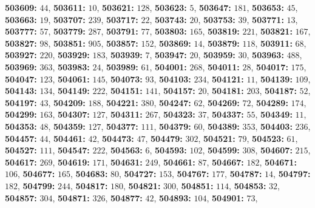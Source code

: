 \textsf{\bfseries 503609:} $44$, \textsf{\bfseries 503611:} $10$, \textsf{\bfseries 503621:} $128$, \textsf{\bfseries 503623:} $5$, \textsf{\bfseries 503647:} $181$, \textsf{\bfseries 503653:} $45$, \textsf{\bfseries 503663:} $19$, \textsf{\bfseries 503707:} $239$, \textsf{\bfseries 503717:} $22$, \textsf{\bfseries 503743:} $20$, \textsf{\bfseries 503753:} $39$, \textsf{\bfseries 503771:} $13$, \textsf{\bfseries 503777:} $57$, \textsf{\bfseries 503779:} $287$, \textsf{\bfseries 503791:} $77$, \textsf{\bfseries 503803:} $165$, \textsf{\bfseries 503819:} $221$, \textsf{\bfseries 503821:} $167$, \textsf{\bfseries 503827:} $98$, \textsf{\bfseries 503851:} $905$, \textsf{\bfseries 503857:} $152$, \textsf{\bfseries 503869:} $14$, \textsf{\bfseries 503879:} $118$, \textsf{\bfseries 503911:} $68$, \textsf{\bfseries 503927:} $220$, \textsf{\bfseries 503929:} $183$, \textsf{\bfseries 503939:} $7$, \textsf{\bfseries 503947:} $20$, \textsf{\bfseries 503959:} $30$, \textsf{\bfseries 503963:} $488$, \textsf{\bfseries 503969:} $363$, \textsf{\bfseries 503983:} $24$, \textsf{\bfseries 503989:} $61$, \textsf{\bfseries 504001:} $268$, \textsf{\bfseries 504011:} $28$, \textsf{\bfseries 504017:} $175$, \textsf{\bfseries 504047:} $123$, \textsf{\bfseries 504061:} $145$, \textsf{\bfseries 504073:} $93$, \textsf{\bfseries 504103:} $234$, \textsf{\bfseries 504121:} $11$, \textsf{\bfseries 504139:} $109$, \textsf{\bfseries 504143:} $134$, \textsf{\bfseries 504149:} $222$, \textsf{\bfseries 504151:} $141$, \textsf{\bfseries 504157:} $20$, \textsf{\bfseries 504181:} $203$, \textsf{\bfseries 504187:} $52$, \textsf{\bfseries 504197:} $43$, \textsf{\bfseries 504209:} $188$, \textsf{\bfseries 504221:} $380$, \textsf{\bfseries 504247:} $62$, \textsf{\bfseries 504269:} $72$, \textsf{\bfseries 504289:} $174$, \textsf{\bfseries 504299:} $163$, \textsf{\bfseries 504307:} $127$, \textsf{\bfseries 504311:} $267$, \textsf{\bfseries 504323:} $37$, \textsf{\bfseries 504337:} $55$, \textsf{\bfseries 504349:} $11$, \textsf{\bfseries 504353:} $48$, \textsf{\bfseries 504359:} $127$, \textsf{\bfseries 504377:} $111$, \textsf{\bfseries 504379:} $60$, \textsf{\bfseries 504389:} $353$, \textsf{\bfseries 504403:} $236$, \textsf{\bfseries 504457:} $44$, \textsf{\bfseries 504461:} $42$, \textsf{\bfseries 504473:} $47$, \textsf{\bfseries 504479:} $302$, \textsf{\bfseries 504521:} $79$, \textsf{\bfseries 504523:} $61$, \textsf{\bfseries 504527:} $111$, \textsf{\bfseries 504547:} $222$, \textsf{\bfseries 504563:} $6$, \textsf{\bfseries 504593:} $102$, \textsf{\bfseries 504599:} $308$, \textsf{\bfseries 504607:} $215$, \textsf{\bfseries 504617:} $269$, \textsf{\bfseries 504619:} $171$, \textsf{\bfseries 504631:} $249$, \textsf{\bfseries 504661:} $87$, \textsf{\bfseries 504667:} $182$, \textsf{\bfseries 504671:} $106$, \textsf{\bfseries 504677:} $165$, \textsf{\bfseries 504683:} $80$, \textsf{\bfseries 504727:} $153$, \textsf{\bfseries 504767:} $177$, \textsf{\bfseries 504787:} $14$, \textsf{\bfseries 504797:} $182$, \textsf{\bfseries 504799:} $244$, \textsf{\bfseries 504817:} $180$, \textsf{\bfseries 504821:} $300$, \textsf{\bfseries 504851:} $114$, \textsf{\bfseries 504853:} $32$, \textsf{\bfseries 504857:} $304$, \textsf{\bfseries 504871:} $326$, \textsf{\bfseries 504877:} $42$, \textsf{\bfseries 504893:} $104$, \textsf{\bfseries 504901:} $73$, 
